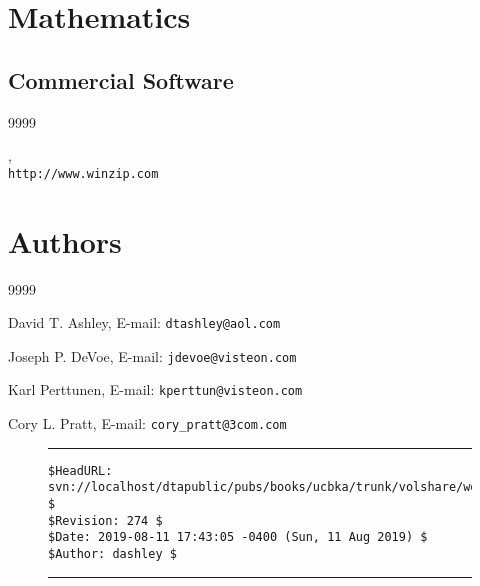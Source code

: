 
\section*{Mathematics}



\subsection*{Commercial Software}

\begin{thecustombibliography}{9999}

, \\
\texttt{http://www.winzip.com}

\end{thecustombibliography}


\section*{Authors}

\begin{thecustombibliography}{9999}

David T. Ashley,
E-mail: \texttt{dtashley@aol.com}

Joseph P. DeVoe,
E-mail: \texttt{jdevoe@visteon.com}

Karl Perttunen,
E-mail: \texttt{kperttun@visteon.com}

Cory L. Pratt,
E-mail: \texttt{cory\_pratt@3com.com}

\end{thecustombibliography}


\noindent\begin{figure}[!b]
\noindent\rule[-0.25in]{\textwidth}{1pt}
\begin{tiny}
\begin{verbatim}
$HeadURL: svn://localhost/dtapublic/pubs/books/ucbka/trunk/volshare/workbibl.tex $
$Revision: 274 $
$Date: 2019-08-11 17:43:05 -0400 (Sun, 11 Aug 2019) $
$Author: dashley $
\end{verbatim}
\end{tiny}
\noindent\rule[0.25in]{\textwidth}{1pt}
\end{figure}

%
